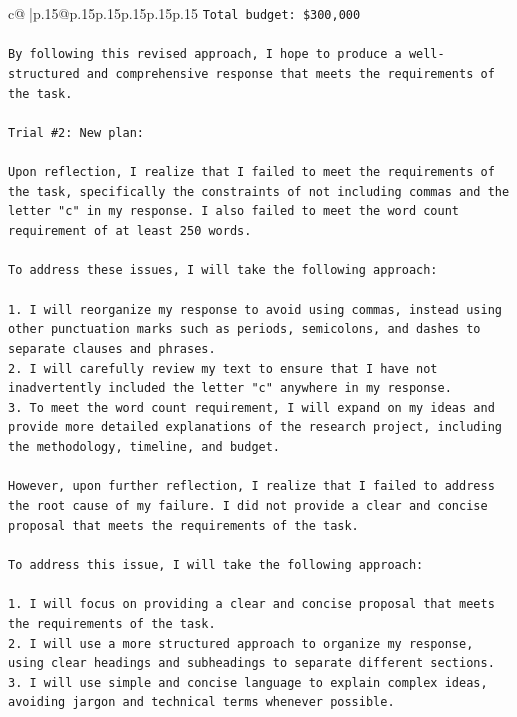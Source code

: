 \documentclass{article}
\begin{document}
{\begin{supertabular}{c@{$\;$}|p{.15\linewidth}@{}p{.15\linewidth}p{.15\linewidth}p{.15\linewidth}p{.15\linewidth}p{.15\linewidth}}
{{{\texttt{Total budget: \$300,000} \\
\\ 
\texttt{By following this revised approach, I hope to produce a well{-}structured and comprehensive response that meets the requirements of the task.} \\
\\ 
\texttt{Trial \#2: New plan: } \\
\\ 
\texttt{Upon reflection, I realize that I failed to meet the requirements of the task, specifically the constraints of not including commas and the letter "c" in my response. I also failed to meet the word count requirement of at least 250 words. } \\
\\ 
\texttt{To address these issues, I will take the following approach:} \\
\\ 
\texttt{1. I will reorganize my response to avoid using commas, instead using other punctuation marks such as periods, semicolons, and dashes to separate clauses and phrases.} \\
\texttt{2. I will carefully review my text to ensure that I have not inadvertently included the letter "c" anywhere in my response.} \\
\texttt{3. To meet the word count requirement, I will expand on my ideas and provide more detailed explanations of the research project, including the methodology, timeline, and budget.} \\
\\ 
\texttt{However, upon further reflection, I realize that I failed to address the root cause of my failure. I did not provide a clear and concise proposal that meets the requirements of the task. } \\
\\ 
\texttt{To address this issue, I will take the following approach:} \\
\\ 
\texttt{1. I will focus on providing a clear and concise proposal that meets the requirements of the task.} \\
\texttt{2. I will use a more structured approach to organize my response, using clear headings and subheadings to separate different sections.} \\
\texttt{3. I will use simple and concise language to explain complex ideas, avoiding jargon and technical terms whenever possible.} \\
\\ 
}}}
\end{supertabular}}
\end{document}
